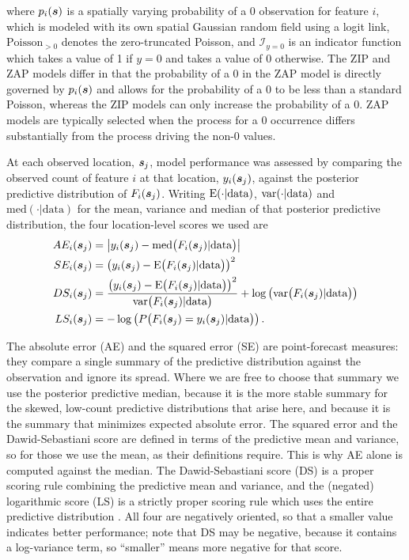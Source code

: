 \documentclass[10pt,letterpaper]{article}
\begin{document}
where $p_i(\mbox{\boldmath $s$})$ is a spatially varying probability of a 0 observation for feature $i$, which is modeled with its own spatial Gaussian random field using a logit link, $\mbox{Poisson}_{>0}$ denotes the zero-truncated Poisson, and $\mathcal{I}_{y=0}$ is an indicator function which takes a value of 1 if $y=0$ and takes a value of 0 otherwise. The ZIP and ZAP models differ in that the probability of a 0 in the ZAP model is directly governed by $p_i(\mbox{\boldmath $s$})$ and allows for the probability of a 0 to be less than a standard Poisson, whereas the ZIP models can only increase the probability of a 0. ZAP models are typically selected when the process for a 0 occurrence differs substantially from the process driving the non-0 values.

At each observed location, $\mbox{\boldmath $s$}_j$, model performance was assessed by comparing the observed count of feature $i$ at that location, $y_i(\mbox{\boldmath $s$}_j)$, against the posterior predictive distribution of $F_i(\mbox{\boldmath $s$}_j)$. Writing $\mbox{E}(\cdot|\mbox{data})$, $\mbox{var}(\cdot|\mbox{data})$ and $\mbox{med}(\cdot|\mbox{data})$ for the mean, variance and median of that posterior predictive distribution, the four location-level scores we used are
\begin{align*}
    AE_i(\mbox{\boldmath $s$}_j)&=\left|y_i(\mbox{\boldmath $s$}_j) - \mbox{med}\big(F_i(\mbox{\boldmath $s$}_j)|\mbox{data}\big)\right|\\
    SE_i(\mbox{\boldmath $s$}_j)&=\left(y_i(\mbox{\boldmath $s$}_j)-  \mbox{E}\big(F_i(\mbox{\boldmath $s$}_j)|\mbox{data}\big)\right)^2\\
    DS_i(\mbox{\boldmath $s$}_j)  &= \frac{\left(y_i(\mbox{\boldmath $s$}_j) - \mbox{E}\big(F_i(\mbox{\boldmath $s$}_j)|\mbox{data}\big)\right)^2}{\mbox{var}\big(F_i(\mbox{\boldmath $s$}_j)|\mbox{data}\big)} + \log\left(\mbox{var}\big(F_i(\mbox{\boldmath $s$}_j)|\mbox{data}\big)\right)\\
    LS_i(\mbox{\boldmath $s$}_j)&=-\log\left(P\big(F_i(\mbox{\boldmath $s$}_j)=y_i(\mbox{\boldmath $s$}_j)|\mbox{data}\big)\right).
\end{align*}

The absolute error (AE) and the squared error (SE) are point-forecast measures: they compare a single summary of the predictive distribution against the observation and ignore its spread. Where we are free to choose that summary we use the posterior predictive median, because it is the more stable summary for the skewed, low-count predictive distributions that arise here, and because it is the summary that minimizes expected absolute error. The squared error and the Dawid-Sebastiani score are defined in terms of the predictive mean and variance, so for those we use the mean, as their definitions require. This is why AE alone is computed against the median. The Dawid-Sebastiani score (DS) is a proper scoring rule combining the predictive mean and variance, and the (negated) logarithmic score (LS) is a strictly proper scoring rule which uses the entire predictive distribution \cite{gneiting2007strictly}. All four are negatively oriented, so that a smaller value indicates better performance; note that DS may be negative, because it contains a log-variance term, so ``smaller'' means more negative for that score.
\end{document}
